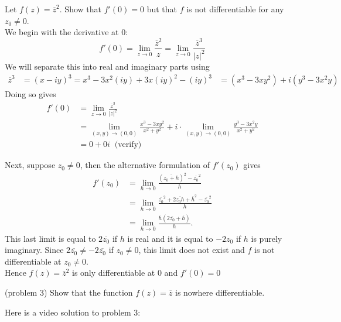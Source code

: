 \documentclass[handout]{ximera}
\begin{document}
\begin{example}[example 3]
Let $f(z) = \overline{z}^2$.  Show that $f'(0) = 0$ but that $f$ is not differentiable for any $z_0 \neq 0$.\\
We begin with the derivative at $0$:
\[
f'(0) = \lim_{z \to  0} \frac{\overline{z}^2}{z} = \lim_{z \to  0} \frac{\overline{z}^3}{|z|^2}
\]
We will separate this into real and imaginary parts using 
\begin{align*}
\overline{z}^3 &= (x -iy)^3 = x^3 - 3x^2(iy) + 3x(iy)^2  - (iy)^3 
              &= (x^3 -3xy^2) + i(y^3 - 3x^2y)
\end{align*}
Doing so gives
\begin{align*}
f'(0) &= \lim_{z \to  0} \frac{\overline{z}^3}{|z|^2}\\
      &= \lim_{(x,y) \to (0,0)} \frac{x^3 -3xy^2}{x^2 +y^2} + i\cdot \lim_{(x,y) \to (0,0)} \frac{y^3 - 3x^2y}{x^2 +y^2}\\
      & = 0 + 0i \;\; \mbox{(verify)}
\end{align*}

Next, suppose $z_0 \neq 0$, then the alternative formulation of $f'(z_0)$ gives
\begin{align*}
f'(z_0) &= \lim_{h \to 0} \frac{\left(\overline{z_0 + h}\right)^2-\overline{z_0}^2 }{h}\\[6pt]
        &=\lim_{h \to 0} \frac{\overline{z_0}^2 +2\overline{z_0h}+ \overline{h}^2 -\overline{z_0}^2 }{h}\\[6pt]
        &=\lim_{h \to 0} \frac{\overline{h} \left(2\overline{z_0}+ \overline{h}\right)}{h}.
\end{align*}
This last limit is equal to $2\overline{z_0}$ if $h$ is real and it is equal to $-2z_0$ if $h$ is purely imaginary.
Since $2\overline{z_0} \neq -2\overline{z_0}$ if $z_0 \neq 0$, this limit does not exist and $f$ is not differentiable at $z_0 \neq 0$.\\
Hence $f(z) = \overline{z}^2$ is only differentiable at $0$ and $f'(0) = 0$

\end{example}


\begin{problem}(problem 3)
Show that the function $f(z) = \overline{z}$ is nowhere differentiable.
\end{problem}

Here is a video solution to problem 3:\\
\begin{foldable}
\end{foldable}
\end{document}
